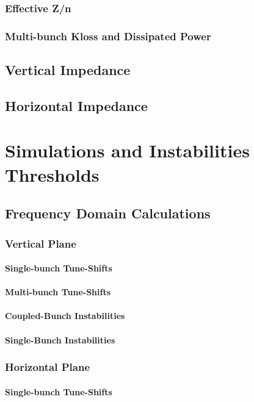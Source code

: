 \subsection{Effective Z/n}
\subsection{Multi-bunch Kloss and Dissipated Power}
\section{Vertical Impedance}
\section{Horizontal Impedance}

\chapter{Simulations and Instabilities Thresholds}
\section{Frequency Domain Calculations}
\subsection{Vertical Plane}
\subsubsection{Single-bunch Tune-Shifts}
\subsubsection{Multi-bunch Tune-Shifts}
\subsubsection{Coupled-Bunch Instabilities}
\subsubsection{Single-Bunch Instabilities}
\subsection{Horizontal Plane}
\subsubsection{Single-bunch Tune-Shifts}
